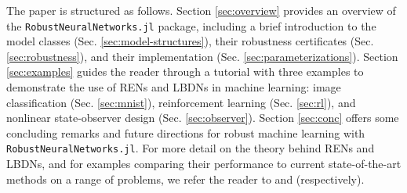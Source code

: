 The paper is structured as follows. Section \ref{sec:overview} provides an overview of the \verb|RobustNeuralNetworks.jl| package, including a brief introduction to the model classes (Sec. \ref{sec:model-structures}), their robustness certificates (Sec. \ref{sec:robustness}), and their implementation (Sec. \ref{sec:parameterizations}). Section \ref{sec:examples} guides the reader through a tutorial with three examples to demonstrate the use of RENs and LBDNs in machine learning: image classification (Sec. \ref{sec:mnist}), reinforcement learning (Sec. \ref{sec:rl}), and nonlinear state-observer design (Sec. \ref{sec:observer}). Section \ref{sec:conc} offers some concluding remarks and future directions for robust machine learning with \verb|RobustNeuralNetworks.jl|. For more detail on the theory behind RENs and LBDNs, and for examples comparing their performance to current state-of-the-art methods on a range of problems, we refer the reader to \cite{Revay++2021b} and \cite{Wang+Manchester2023} (respectively).
